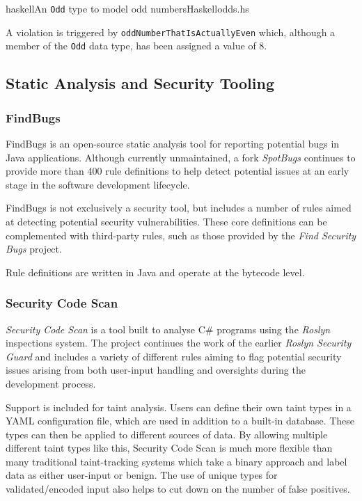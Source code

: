 \documentclass[a4paper,openany,12pt]{book}
\begin{document}
\begin{mycodefile}{haskell}{\label{code:liquidhaskell:1}An \texttt{Odd} type to model odd numbers}{Haskell}{odds.hs}

    A violation is triggered by \texttt{oddNumberThatIsActuallyEven} which, although a member of the \texttt{Odd} data
    type, has been assigned a value of 8.
    \vspace{0.5em}
\end{mycodefile}

\subsection{Static Analysis and Security Tooling}

\subsubsection{FindBugs}

FindBugs is an open-source static analysis tool for reporting potential bugs in Java applications.
Although currently unmaintained, a fork \emph{SpotBugs} continues to provide more than 400 rule definitions
to help detect potential issues at an early stage in the software development lifecycle.

FindBugs is not exclusively a security tool, but includes a number of rules aimed at detecting potential security
vulnerabilities.
These core definitions can be complemented with third-party rules, such as those provided by the
\emph{Find Security Bugs} project.

Rule definitions are written in Java and operate at the bytecode level.

\subsubsection{Security Code Scan}

\emph{Security Code Scan} is a tool built to analyse C\# programs using the \emph{Roslyn} inspections system.
The project continues the work of the earlier \emph{Roslyn Security Guard} and includes a variety of different rules
aiming to flag potential security issues arising from both user-input handling and oversights during the development
process.

Support is included for taint analysis.
Users can define their own taint types in a YAML configuration file, which are used in addition to a built-in database.
These types can then be applied to different sources of data.
By allowing multiple different taint types like this, Security Code Scan is much more flexible than many traditional
taint-tracking systems which take a binary approach and label data as either user-input or benign.
The use of unique types for validated/encoded input also helps to cut down on the number of false positives.
\end{document}

